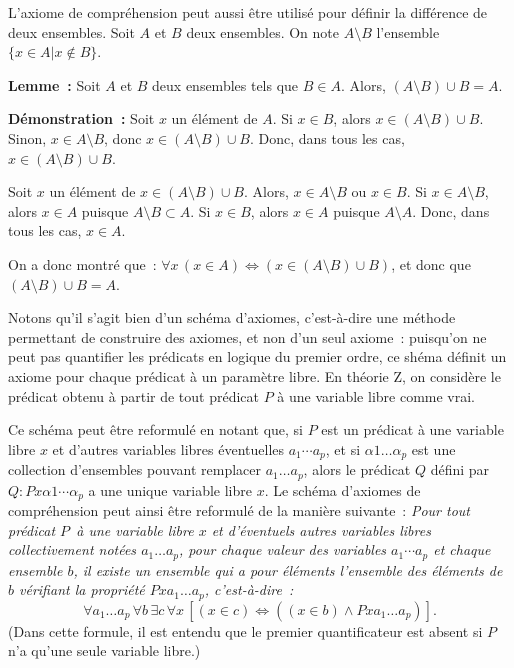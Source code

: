     \done

\medskip

L'axiome de compréhension peut aussi être utilisé pour définir la différence de deux ensembles. 
Soit $A$ et $B$ deux ensembles. 
On note $A \setminus B$ l'ensemble $\lbrace x \in A \vert x \notin B \rbrace$.

\medskip

\noindent\textbf{Lemme :} Soit $A$ et $B$ deux ensembles tels que $B \in A$.
    Alors, $(A \setminus B) \cup B = A$.

\medskip

\noindent\textbf{Démonstration :}
    Soit $x$ un élément de $A$. 
    Si $x \in B$, alors $x \in (A \setminus B) \cup B$.
    Sinon, $x \in A \setminus B$, donc $x \in (A \setminus B) \cup B$.
    Donc, dans tous les cas, $x \in (A \setminus B) \cup B$.

    Soit $x$ un élément de $x \in (A \setminus B) \cup B$.
    Alors, $x \in A \setminus B$ ou $x \in B$. 
    Si $ x \in A \setminus B$, alors $x \in A$ puisque $A \setminus B \subset A$.
    Si $ x \in B$, alors $x \in A$ puisque $A \setminus A$.
    Donc, dans tous les cas, $x \in A$.

    On a donc montré que : $\forall x \, (x \in A) \Leftrightarrow (x \in (A \setminus B) \cup B)$, et donc que $(A \setminus B) \cup B = A$.

    \done

\medskip

Notons qu'il s'agit bien d'un schéma d'axiomes, c'est-à-dire une méthode permettant de construire des axiomes, et non d'un seul axiome : puisqu'on ne peut pas quantifier les prédicats en logique du premier ordre, ce shéma définit un axiome pour chaque prédicat à un paramètre libre. 
En théorie Z, on considère le prédicat obtenu à partir de tout prédicat $P$ à une variable libre comme vrai.

Ce schéma peut être reformulé en notant que, si $P$ est un prédicat à une variable libre $x$ et d'autres variables libres éventuelles $a_1 \cdots a_p$, et si $\alpha 1 \dots \alpha_p$ est une collection d'ensembles pouvant remplacer $a_1 \dots a_p$, alors le prédicat $Q$ défini par $Q: P x \alpha1 \cdots \alpha_p$ a une unique variable libre $x$. 
Le schéma d'axiomes de compréhension peut ainsi être reformulé de la manière suivante : 
\textit{Pour tout prédicat $P$ à une variable libre $x$ et d'éventuels autres variables libres collectivement notées $a_1 \dots a_p$, pour chaque valeur des variables $a_1 \cdots a_p$ et chaque ensemble $b$, il existe un ensemble qui a pour éléments l'ensemble des éléments de $b$ vérifiant la propriété $P x a_1 \dots a_p$, c'est-à-dire :}
\begin{equation*}
\forall a_1 \dots a_p \, \forall b \, \exists c \, \forall x \, [ (x \in c) \Leftrightarrow ((x \in b) \wedge P x a_1 \dots a_p)]. 
\end{equation*}
(Dans cette formule, il est entendu que le premier quantificateur est absent si $P$ n'a qu'une seule variable libre.) 

